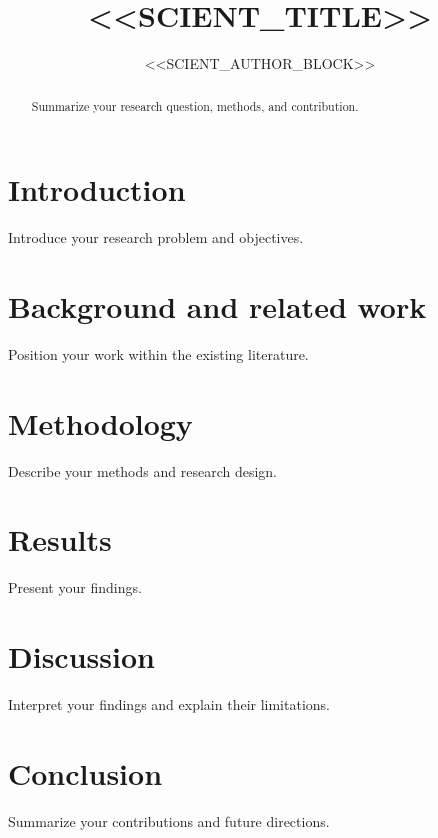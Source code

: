 \documentclass[11pt,a4paper]{article}
\title{<<SCIENT_TITLE>>}
\author{<<SCIENT_AUTHOR_BLOCK>>}
\date{}
\begin{document}
\maketitle

\begin{abstract}
Summarize your research question, methods, and contribution.
\end{abstract}

\tableofcontents
\newpage

\section{Introduction}

Introduce your research problem and objectives.

\section{Background and related work}

Position your work within the existing literature.

\section{Methodology}

Describe your methods and research design.

\section{Results}

Present your findings.

\section{Discussion}

Interpret your findings and explain their limitations.

\section{Conclusion}

Summarize your contributions and future directions.
\end{document}
